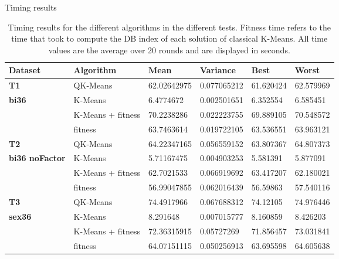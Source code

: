 Timing results


\begin{table}[h]
\caption{Timing results for the different algorithms in the different tests. Fitness time refers to the time that took to compute the DB index of each solution of classical K-Means. All time values are the average over 20 rounds and are displayed in seconds.}
\begin{tabular}{|l|l|l|l|l|l|}
\hline
\textbf{Dataset}               & \textbf{Algorithm} & \textbf{Mean} & \textbf{Variance} & \textbf{Best} & \textbf{Worst} \\ \hline
\textbf{T1}                    & QK-Means           & 62.02642975   & 0.077065212       & 61.620424     & 62.579969      \\ \cline{2-6} 
\textbf{bi36}                  & K-Means            & 6.4774672     & 0.002501651       & 6.352554      & 6.585451       \\ \cline{2-6} 
\textbf{}                      & K-Means + fitness  & 70.2238286    & 0.022223755       & 69.889105     & 70.548572      \\ \cline{2-6} 
\textbf{}                      & fitness            & 63.7463614    & 0.019722105       & 63.536551     & 63.963121      \\ \hline
\textbf{T2}                    & QK-Means           & 64.22347165   & 0.056559152       & 63.807367     & 64.807373      \\ \cline{2-6} 
\textbf{bi36 noFactor} & K-Means            & 5.71167475    & 0.004903253       & 5.581391      & 5.877091       \\ \cline{2-6} 
\textbf{}                      & K-Means + fitness  & 62.7021533    & 0.066919692       & 63.417207     & 62.180021      \\ \cline{2-6} 
\textbf{}                      & fitness            & 56.99047855   & 0.062016439       & 56.59863      & 57.540116      \\ \hline
\textbf{T3}                    & QK-Means           & 74.4917966    & 0.067688312       & 74.12105      & 74.976446      \\ \cline{2-6} 
\textbf{sex36}                 & K-Means            & 8.291648      & 0.007015777       & 8.160859      & 8.426203       \\ \cline{2-6} 
                               & K-Means + fitness  & 72.36315915   & 0.05727269        & 71.856457     & 73.031841      \\ \cline{2-6} 
                               & fitness            & 64.07151115   & 0.050256913       & 63.695598     & 64.605638      \\ \hline
\end{tabular}
\end{table}

